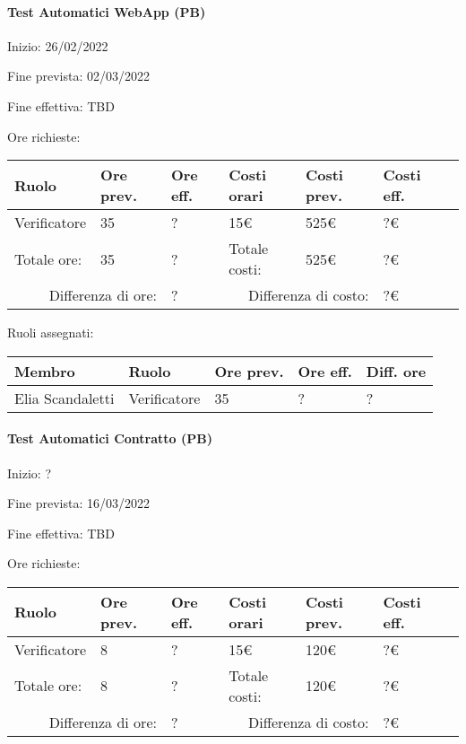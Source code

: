 \documentclass[a4paper, 12pt]{article}
\begin{document}
\paragraph{Test Automatici WebApp (PB)}
Inizio: 26/02/2022\par
Fine prevista: 02/03/2022\par
Fine effettiva: TBD

Ore richieste:\\[0.5em]
\begin{tabular}{|l|l|l||l|l|l|l|}\hline
Ruolo & Ore prev. & Ore eff. & Costi orari & Costi prev. & Costi eff.\\\hline
Verificatore & 35 & ? & 15\euro & 525\euro & ?\euro \\\hline
Totale ore: & 35 & ? & Totale costi: & 525\euro & ?\euro \\\hline
\multicolumn{2}{|r|}{Differenza di ore:} & ? & \multicolumn{2}{r|}{Differenza di costo:} & ?\euro \\\hline
\end{tabular}

Ruoli assegnati:\\[0.5em]
\begin{tabular}{|l|l|l|l|l|}\hline
Membro & Ruolo & Ore prev. & Ore eff. & Diff. ore \\\hline
Elia Scandaletti & Verificatore & 35 & ? & ? \\\hline
\end{tabular}

\paragraph{Test Automatici Contratto (PB)}
Inizio: ?\par
Fine prevista: 16/03/2022\par
Fine effettiva: TBD

Ore richieste:\\[0.5em]
\begin{tabular}{|l|l|l||l|l|l|l|}\hline
Ruolo & Ore prev. & Ore eff. & Costi orari & Costi prev. & Costi eff.\\\hline
Verificatore & 8 & ? & 15\euro & 120\euro & ?\euro \\\hline
Totale ore: & 8 & ? & Totale costi: & 120\euro & ?\euro \\\hline
\multicolumn{2}{|r|}{Differenza di ore:} & ? & \multicolumn{2}{r|}{Differenza di costo:} & ?\euro \\\hline
\end{tabular}
\end{document}

